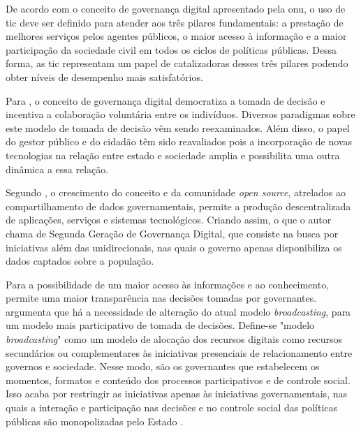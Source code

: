 \par
De acordo com o conceito de governança digital apresentado pela \acrshort{onu}, o uso de \acrfull{tic} deve ser definido para atender aos três pilares fundamentais: a prestação de melhores serviços pelos agentes públicos, o maior acesso à informação e a maior participação da sociedade civil em todos os ciclos de políticas públicas. Dessa forma, as \acrshort{tic} representam um papel de catalizadoras desses três pilares podendo obter níveis de desempenho mais satisfatórios. 
\par
Para \cite{rushkoff2003open}, o conceito de governança digital democratiza a tomada de decisão e incentiva a colaboração voluntária entre os indivíduos. Diversos paradigmas sobre este modelo de tomada de decisão vêm sendo reexaminados. Além disso, o papel do gestor público e do cidadão têm sido reavaliados pois a incorporação de novas tecnologias na relação entre estado e sociedade amplia e possibilita uma outra dinâmica a essa relação. 

\par
Segundo , o crescimento do conceito e da comunidade \textit{open source}, atrelados ao compartilhamento de dados governamentais, permite a produção descentralizada de aplicações, serviços e sistemas tecnológicos. Criando assim, o que o autor chama de Segunda Geração de Governança Digital, que consiste na busca por iniciativas além das unidirecionais, nas quais o governo apenas disponibiliza os dados captados sobre a população.

\vspace{0.3CM}

\par
Para  a possibilidade de um maior acesso às informações e ao conhecimento, permite uma maior transparência nas decisões tomadas por governantes.  argumenta que há a necessidade de alteração do atual modelo \textit{broadcasting}, para um modelo mais participativo de tomada de decisões. Define-se "modelo \textit{broadcasting}" como um modelo de alocação dos recursos digitais como recursos secundários ou complementares às iniciativas presenciais de relacionamento entre governos e sociedade. Nesse modo, são os governantes que estabelecem os momentos, formatos e conteúdo dos processos participativos e de controle social. Isso acaba por restringir as iniciativas apenas às iniciativas governamentais, nas quais a interação e participação nas decisões e no controle social das políticas públicas 
são monopolizadas pelo Estado \cite{parra2017governancca}.


